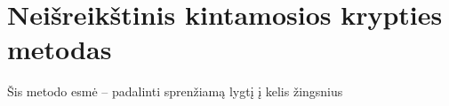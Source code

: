\section{Neišreikštinis kintamosios krypties metodas}

Šis metodo esmė -- padalinti sprenžiamą lygtį į kelis žingsnius